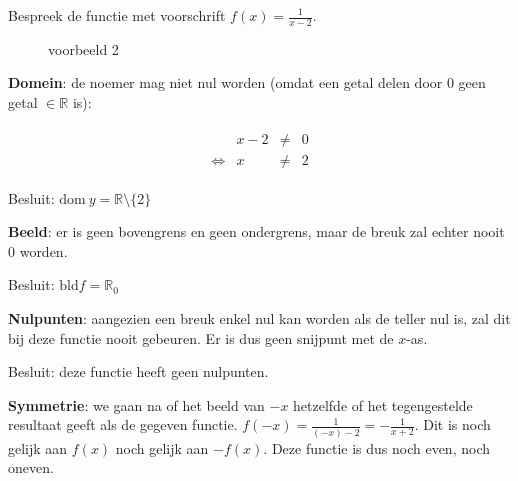 \begin{voorbeeld}
	Bespreek de functie met voorschrift $f(x)=\frac{1}{x-2}$.


\begin{figure}[H]
	\centering          
	
	\caption{voorbeeld 2}
	\label{fig:reele_functies_vb2}	
\end{figure}




\textbf{Domein}: de noemer mag niet nul worden (omdat een
getal delen door $0$ geen getal $\in \mathbb{R}$ is):


\begin{eqnarray*}
	\begin{array}{cccc}
		& x-2 & \neq & 0\\
		\iff & x & \neq & 2
	\end{array}
\end{eqnarray*}


Besluit: $\textrm{dom}\:y=\mathbb{R}\setminus\{2\}$ 




\textbf{Beeld}: er is geen bovengrens en geen ondergrens,
maar de breuk zal echter nooit $0$ worden.

Besluit: $\textrm{bld}f=\mathbb{R}_{0}$




\textbf{Nulpunten}: aangezien een breuk enkel nul kan worden
als de teller nul is, zal dit bij deze functie nooit gebeuren. Er
is dus geen snijpunt met de $x$-as.

Besluit: deze functie heeft geen nulpunten.




\textbf{Symmetrie}: we gaan na of het beeld van $-x$ hetzelfde
of het tegengestelde resultaat geeft als de gegeven functie. $f(-x)=\frac{1}{(-x)-2}=-\frac{1}{x+2}$.
Dit is noch gelijk aan $f(x)$ noch gelijk aan $-f(x)$. Deze functie
is dus noch even, noch oneven.

\end{voorbeeld}

